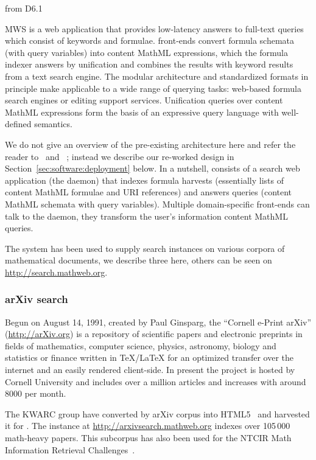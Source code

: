 \begin{newpart}{from D6.1}

MWS is a web application that provides low-latency answers to full-text queries which consist of keywords and formulae.
\MWS front-ends convert formula schemata (with query variables) into content MathML expressions, which the \MWS formula indexer answers by unification and combines the results with keyword results from a text search engine.
The modular architecture and standardized formats in principle make \MWS applicable to a wide range of querying tasks:
web-based formula search engines or editing support services. 
Unification queries over content MathML expressions form the basis of an expressive query language with well-defined semantics.

We do not give an overview of the pre-existing \MWS architecture here and refer the reader to~\cite{ProKoh:mwssofse12} and ~\cite{ODK-D6.1}; instead we describe our re-worked design in Section~\ref{sec:software:deployment} below.
In a nutshell, \MWS consists of a search web application (the \MWS daemon) that indexes formula harvests (essentially lists of content MathML formulae and URI references) and answers queries (content MathML schemata with query variables).
Multiple domain-specific front-ends can talk to the \MWS daemon, they transform the user's information content MathML queries. 

The \MWS system has been used to supply search instances on various corpora of mathematical documents, we describe three here, others can be seen on \url{http://search.mathweb.org}. 

\subsubsection{arXiv search}

Begun on August 14, 1991, created by Paul Ginsparg, the ``Cornell e-Print arXiv''
(\url{http://arXiv.org}) is a repository of scientific papers and electronic preprints in
fields of mathematics, computer science, physics, astronomy, biology and statistics or
finance written in {\TeX/\LaTeX} for an optimized transfer over the internet and an easily
rendered client-side. In present the project is hosted by Cornell University and includes
over a million articles and increases with around 8000 per month.

The KWARC group have converted by arXiv corpus into HTML5~\cite{StaKoh:tlcspx10} and
harvested it for \MWS. The instance at \url{http://arxivsearch.mathweb.org}
indexes over 105\,000 math-heavy papers. This subcorpus has also been used for the NTCIR
Math Information Retrieval
Challenges~\cite{AizKohOun:nmpto13,AizKohOunSch:nmto14,AizKohOunSch:nmto16}.


\end{newpart}

